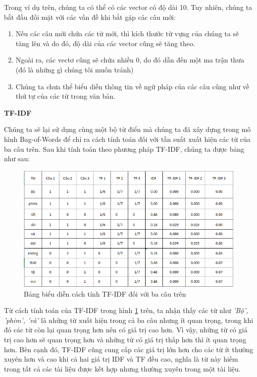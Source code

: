 Trong ví dụ trên, chúng ta có thể có các vector có độ dài 10. Tuy nhiên, chúng ta bắt đầu đối mặt với các vấn đề khi bắt gặp các câu mới:
\begin{enumerate}
  \item Nếu các câu mới chứa các từ mới, thì kích thước từ vựng của chúng ta sẽ tăng lên và do đó, độ dài của các vector cũng sẽ tăng theo.
  \item Ngoài ra, các vectơ cũng sẽ chứa nhiều 0, do đó dẫn đến một ma trận thưa (đó là những gì chúng tôi muốn tránh)
  \item Chúng ta chưa thể biểu diễn thông tin về ngữ pháp của các câu cũng như về thứ tự của các từ trong văn bản.
\end{enumerate}

\textbf{\textsc{TF-IDF}}

Chúng ta sẽ lại sử dụng cùng một bộ từ điển mà chúng ta đã xây dựng trong mô hình Bag-of-Words để chỉ ra cách tính toán đối với tần suất xuất hiện các từ của ba câu trên. Sau khi tính toán theo phương pháp TF-IDF, chúng ta được bảng như sau:

\begin{figure}[!h]
	\centering
		\includegraphics[width=1\columnwidth]{chapter05/figure/tf-idf.PNG}
        \caption{Bảng biểu diễn cách tính TF-IDF đối với ba câu trên}
        \label{fig:sec6:tf-idf}
\end{figure}

Từ cách tính toán của TF-IDF trong hình \ref{fig:sec6:tf-idf} trên, ta nhận thấy các từ như \textit{'Bộ', 'phim', 'và' }  là những từ xuất hiện trong cả ba câu nhưng ít quan trọng, trong khi đó các từ còn lại quan trọng hơn nên có giá trị cao hơn. Vì vậy, những từ có giá trị cao hơn sẽ quan trọng hơn và những từ có giá trị thấp hơn thì ít quan trọng hơn. Bên cạnh đó, TF-IDF cũng cung cấp các giá trị lớn hơn cho các từ ít thường xuyên hơn và cao khi cả hai giá trị IDF và TF đều cao, nghĩa là từ này hiếm trong tất cả các tài liệu được kết hợp nhưng thường xuyên trong một tài liệu.

